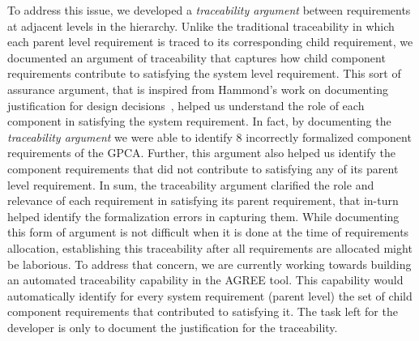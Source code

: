 To address this issue, we developed a \emph{traceability argument} between requirements at adjacent levels in the hierarchy. Unlike the traditional traceability in which each parent level requirement is traced to its corresponding child requirement, we documented an argument of traceability that captures how child component requirements contribute to satisfying the system level requirement. This sort of assurance argument, that is inspired from Hammond's work on documenting justification for design decisions~\cite{Hammond01:WiW}, helped us understand the role of each component in satisfying the system requirement. In fact, by documenting the \emph{traceability argument} we were able to identify 8 incorrectly formalized component requirements of the GPCA. Further, this argument also helped us identify the component requirements that did not contribute to satisfying any of its parent level requirement. In sum, the traceability argument clarified the role and relevance of each requirement in satisfying its parent requirement, that in-turn helped identify the formalization errors in capturing them. While documenting this form of argument is not difficult when it is done at the time of requirements allocation, establishing this traceability after all requirements are allocated might be laborious. To address that concern, we are currently working towards building an automated traceability capability in the AGREE tool. This capability would automatically identify for every system requirement (parent level) the set of child component requirements that contributed to satisfying it. The task left for the developer is only to document the justification for the traceability.
